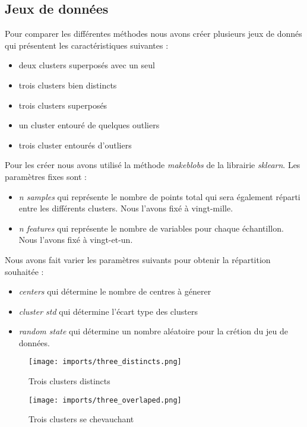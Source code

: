 \subsection{Jeux de données}
Pour comparer les différentes méthodes nous avons créer plusieurs jeux de donnés qui présentent les caractéristiques suivantes :
\begin{itemize}
    \item deux clusters superposés avec un seul
    \item  trois clusters bien distincts
    \item trois clusters superposés
    \item un cluster entouré de quelques outliers
    \item trois cluster entourés d’outliers     
\end{itemize}
Pour les créer nous avons utilisé la méthode \textit{makeblobs} de la librairie \textit{sklearn}. Les paramètres fixes sont :
\begin{itemize}
    \item \textit{n samples} qui représente le nombre de points total qui sera également réparti entre les différents clusters. Nous l'avons fixé à vingt-mille.
    \item \textit{n features} qui représente le nombre de variables pour chaque échantillon. Nous l'avons fixé à vingt-et-un.
\end{itemize}
Nous avons fait varier les paramètres suivants pour obtenir la répartition souhaitée : 
\begin{itemize}
    \item \textit{centers} qui détermine le nombre de centres à génerer
    \item \textit{cluster std} qui détermine l'écart type des clusters
    \item \textit{random state} qui détermine un nombre aléatoire pour la crétion du jeu de données.
\end{itemize}


\begin{center}
    \begin{figure}[ht!]
        \centering
        
        \texttt{[image: imports/three\_distincts.png]}
        
        \caption{Trois clusters distincts}
    \end{figure}
\end{center}

\begin{center}
    \begin{figure}[ht!]
        \centering
        
        \texttt{[image: imports/three\_overlaped.png]}
        
        \caption{Trois clusters se chevauchant}
    \end{figure}
\end{center}

